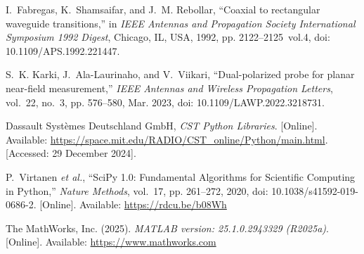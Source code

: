 \documentclass[journal]{IEEEtran}
\begin{document}
\begin{thebibliography}{99}
    I.~Fabregas, K.~Shamsaifar, and J.~M. Rebollar, ``Coaxial to rectangular waveguide transitions,'' in \emph{IEEE Antennas and Propagation Society International Symposium 1992 Digest}, Chicago, IL, USA, 1992, pp. 2122--2125~vol.4, doi: 10.1109/APS.1992.221447.

    S.~K. Karki, J.~Ala-Laurinaho, and V.~Viikari, ``Dual-polarized probe for planar near-field measurement,'' \emph{IEEE Antennas and Wireless Propagation Letters}, vol.~22, no.~3, pp. 576--580, Mar. 2023, doi: 10.1109/LAWP.2022.3218731.

    Dassault Syst\`emes Deutschland GmbH, \emph{CST Python Libraries}. [Online]. Available: \url{https://space.mit.edu/RADIO/CST_online/Python/main.html}. [Accessed: 29 December 2024].

    P.~Virtanen \emph{et al.}, ``SciPy 1.0: Fundamental Algorithms for Scientific Computing in Python,'' \emph{Nature Methods}, vol.~17, pp. 261--272, 2020, doi: 10.1038/s41592-019-0686-2. [Online]. Available: \url{https://rdcu.be/b08Wh}

    The MathWorks, Inc. (2025). \emph{MATLAB version: 25.1.0.2943329 (R2025a)}. [Online]. Available: \url{https://www.mathworks.com}
\end{thebibliography}
\end{document}
